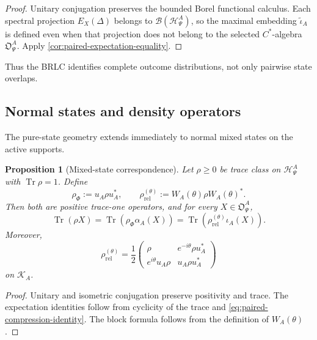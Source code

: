 \documentclass[11pt,reqno]{scrartcl}
\newcommand{\polA}{u_A}
\newcommand{\actHP}{\mathscr H_{\Psi}^{A}}
\newcommand{\actK}{\mathscr K_{A}}
\newcommand{\WAtheta}{W_{A}(\theta)}
\newcommand{\alphaA}{\alpha_{A}}
\newcommand{\iotaA}{\iota_{A}}
\newcommand{\iotaMaxA}{\widetilde{\iota}_{A}}
\newcommand{\obsP}{\mathfrak O_{\Psi}^{A}}
\DeclareMathOperator{\Tr}{Tr}
\theoremstyle{plain}
\newtheorem{proposition}[proposition]{Proposition}
\theoremstyle{definition}
\theoremstyle{remark}
\begin{document}
\begin{proof}
Unitary conjugation preserves the bounded Borel functional calculus.  Each
spectral projection $E_X(\Delta)$ belongs to $\mathcal B(\actHP)$, so the
maximal embedding $\iotaMaxA$ is defined even when that projection does not
belong to the selected $C^*$-algebra $\obsP$.  Apply
\cref{cor:paired-expectation-equality}.
\end{proof}

Thus the BRLC identifies complete outcome distributions, not only pairwise
state overlaps.

\subsection{Normal states and density operators}

The pure-state geometry extends immediately to normal mixed states on the
active supports.

\begin{proposition}[Mixed-state correspondence]
\label{prop:mixed-state-correspondence}
Let \(\rho\ge0\) be trace class on \(\actHP\) with \(\Tr\rho=1\).  Define
\begin{equation}
  \rho_{\Phi}:=\polA\rho\polA^*,
  \qquad
  \rho_{\mathrm{rel}}^{(\theta)}
  :=\WAtheta\rho\WAtheta^*.
  \label{eq:mixed-state-maps}
\end{equation}
Then both are positive trace-one operators, and for every \(X\in\obsP\),
\begin{equation}
  \boxed{
  \Tr(\rho X)
  =\Tr(\rho_{\Phi}\alphaA(X))
  =\Tr(\rho_{\mathrm{rel}}^{(\theta)}\iotaA(X)).}
  \label{eq:mixed-state-expectation-equality}
\end{equation}
Moreover,
\begin{equation}
  \rho_{\mathrm{rel}}^{(\theta)}
  =\frac12
   \begin{pmatrix}
     \rho&e^{-i\theta}\rho\polA^*\\
     e^{i\theta}\polA\rho&\polA\rho\polA^*
   \end{pmatrix}
  \label{eq:relational-density-block}
\end{equation}
on \(\actK\).
\end{proposition}

\begin{proof}
Unitary and isometric conjugation preserve positivity and trace.  The
expectation identities follow from cyclicity of the trace and
\eqref{eq:paired-compression-identity}.  The block formula follows from the
definition of \(\WAtheta\).
\end{proof}
\end{document}
